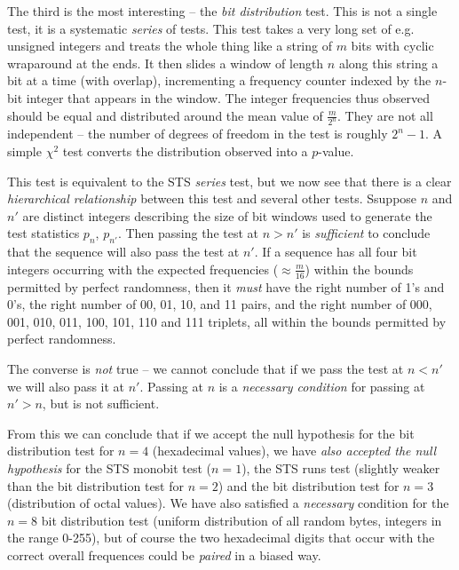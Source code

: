 \documentclass[12pt]{book}
\begin{document}
The third is the most interesting -- the {\em bit distribution} test.
This is not a single test, it is a systematic {\em series} of tests.
This test takes a very long set of e.g. unsigned integers and treats the
whole thing like a string of $m$ bits with cyclic wraparound at the
ends.  It then slides a window of length $n$ along this string a bit at
a time (with overlap), incrementing a frequency counter indexed by the
$n$-bit integer that appears in the window.  The integer frequencies
thus observed should be equal and distributed around the mean value of
$\frac{m}{2^n}$.  They are not all independent -- the number of degrees
of freedom in the test is roughly $2^n - 1$.  A simple $\chi^2$ test
converts the distribution observed into a $p$-value.

This test is equivalent to the STS {\em series} test, but we now see
that there is a clear {\em hierarchical relationship} between this test
and several other tests.  Ssuppose $n$ and $n'$ are distinct integers
describing the size of bit windows used to generate the test statistics
$p_n$, $p_{n'}$.  Then passing the test at $n > n'$ is {\em sufficient}
to conclude that the sequence will also pass the test at $n'$.  If a
sequence has all four bit integers occurring with the expected
frequencies ($\approx \frac{m}{16}$) within the bounds permitted by
perfect randomness, then it {\em must} have the right number of 1's and
0's, the right number of 00, 01, 10, and 11 pairs, and the right number
of 000, 001, 010, 011, 100, 101, 110 and 111 triplets, all within the
bounds permitted by perfect randomness.

The converse is {\em not} true -- we cannot conclude that if we pass the
test at $n < n'$ we will also pass it at $n'$.  Passing at $n$ is a {\em
necessary condition} for passing at $n' > n$, but is not sufficient.

From this we can conclude that if we accept the null hypothesis for the
bit distribution test for $n = 4$ (hexadecimal values), we have {\em
also accepted the null hypothesis} for the STS monobit test ($n = 1$),
the STS runs test (slightly weaker than the bit distribution test for $n
= 2$) and the bit distribution test for $n = 3$ (distribution of octal
values).  We have also satisfied a {\em necessary} condition for the $n
= 8$ bit distribution test (uniform distribution of all random bytes,
integers in the range 0-255), but of course the two hexadecimal digits
that occur with the correct overall frequences could be {\em paired} in
a biased way.
\end{document}
